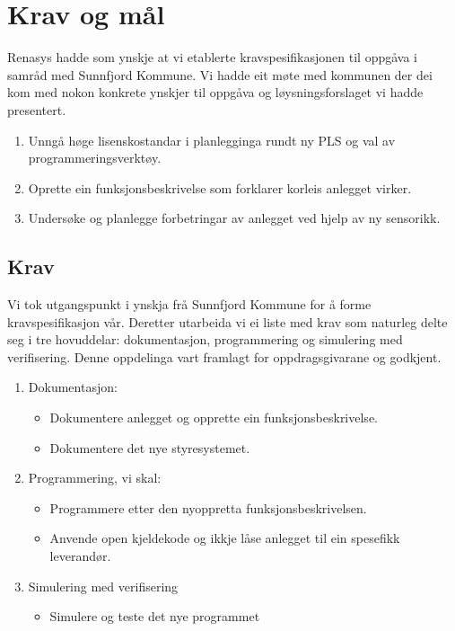 \chapter{Krav og mål}
\thispagestyle{fancy}
\gls{Renasys} hadde som ynskje at vi etablerte kravspesifikasjonen til oppgåva 
i samråd med \gls{Sunnfjord Kommune}.\newline
Vi hadde eit møte med kommunen der dei kom med nokon konkrete ynskjer til oppgåva
og løysningsforslaget vi hadde presentert.

\begin{enumerate}
    \item Unngå høge lisenskostandar i planlegginga rundt ny PLS og val av programmeringsverktøy.
    \item Oprette ein funksjonsbeskrivelse som forklarer korleis anlegget virker.
    \item Undersøke og planlegge forbetringar av anlegget ved hjelp av ny sensorikk.
\end{enumerate}


\section{Krav}
Vi tok utgangspunkt i ynskja frå \gls{Sunnfjord Kommune} for å forme kravspesifikasjon vår.
Deretter utarbeida vi ei liste med krav som naturleg delte seg i tre
hovuddelar: dokumentasjon, programmering og simulering med verifisering. 
Denne oppdelinga vart framlagt for oppdragsgivarane og godkjent. 

\begin{enumerate}
    \item Dokumentasjon:
    \begin{itemize}
        \item Dokumentere anlegget og opprette ein funksjonsbeskrivelse.
        \item Dokumentere det nye styresystemet.
    \end{itemize}
    \item Programmering, vi skal:
    \begin{itemize}
        \item Programmere etter den nyoppretta funksjonsbeskrivelsen.
        \item Anvende open kjeldekode og ikkje låse anlegget til ein spesefikk leverandør.
    \end{itemize}
    \item Simulering med verifisering
    \begin{itemize}
        \item Simulere og teste det nye programmet
    \end{itemize}
\end{enumerate}


